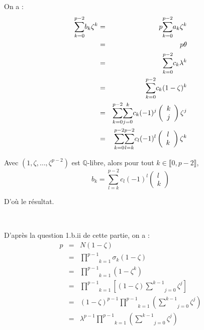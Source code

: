 On a :
\begin{eqnarray*}
  \underset{k = 0}{\overset{p - 2}{\sum}} b_k \zeta^k & = & p \underset{k =
  0}{\overset{p - 2}{\sum}} a_k \zeta^k\\
  & = & p \theta\\
  & = & \underset{k = 0}{\overset{p - 2}{\sum}} c_k \lambda^k\\
  & = & \underset{k = 0}{\overset{p - 2}{\sum}} c_k (1 - \zeta)^k\\
  & = & \underset{k = 0}{\overset{p - 2}{\sum}} \boldsymbol{} \underset{j =
  0}{\overset{k}{\sum}} c_k (- 1)^j \left( \begin{array}{c}
    k\\
    j
  \end{array} \right) \zeta^j\\
  & = & \underset{k = 0}{\overset{p - 2}{\sum}} \boldsymbol{} \underset{l =
  k}{\overset{p - 2}{\sum}} c_l (- 1)^l \left( \begin{array}{c}
    l\\
    k
  \end{array} \right) \zeta^k
\end{eqnarray*}


Avec $(1, \zeta, \ldots, \zeta^{p - 2})$ est $\mathbb{Q}$-libre, alors pour
tout $k \in \llbracket 0, p - 2 \rrbracket$,
\[ b_k = \underset{l = k}{\overset{p - 2}{\sum}} c_l (- 1)^l \left(
   \begin{array}{c}
     l\\
     k
   \end{array} \right) \]


D'o{\`u} le r{\'e}sultat.

\

 D'apr{\`e}s la question 1.b.ii de cette partie, on a :
\begin{eqnarray*}
  p & = & N (1 - \zeta)\\
  & = & \underset{k = 1}{\overset{p - 1}{\prod}} \sigma_k (1 - \zeta)\\
  & = & \underset{k = 1}{\overset{p - 1}{\prod}} (1 - \zeta^k)\\
  & = & \underset{k = 1}{\overset{p - 1}{\prod}} \left[ (1 - \zeta)
  \underset{j = 0}{\overset{k - 1}{\sum}} \zeta^j \right]\\
  & = & (1 - \zeta)^{p - 1} \underset{k = 1}{\overset{p - 1}{\prod}} \left(
  \underset{j = 0}{\overset{k - 1}{\sum}} \zeta^j \right)\\
  & = & \lambda^{p - 1} \underset{k = 1}{\overset{p - 1}{\prod}} \left(
  \underset{j = 0}{\overset{k - 1}{\sum}} \zeta^j \right)
\end{eqnarray*}


